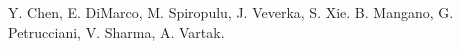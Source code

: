 \begin{Authlist}
%
Y. Chen, E. DiMarco, M. Spiropulu, J. Veverka, S. Xie.
B. Mangano, G. Petrucciani, V. Sharma, A. Vartak.
%

\end{Authlist}
